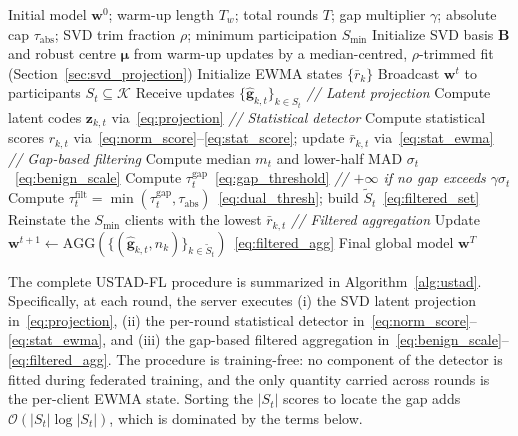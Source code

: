 \documentclass[journal]{IEEEtran}
\begin{document}
\begin{algorithm}[t]
\caption{USTAD-FL: Unsupervised Statistical Anomaly Detection at the server}
\label{alg:ustad}
\begin{algorithmic}[1]
\REQUIRE Initial model $\mathbf{w}^{0}$; warm-up length $T_w$; total rounds $T$; gap multiplier $\gamma$; absolute cap $\tau_{\mathrm{abs}}$; SVD trim fraction $\rho$; minimum participation $S_{\min}$
\STATE Initialize SVD basis $\mathbf{B}$ and robust centre $\boldsymbol{\mu}$ from warm-up updates by a median-centred, $\rho$-trimmed fit (Section~\ref{sec:svd_projection})
\STATE Initialize EWMA states $\{\bar r_{k}\}$
    \STATE Broadcast $\mathbf{w}^{t}$ to participants $S_t \subseteq \mathcal{K}$
    \STATE Receive updates $\{\hat{\mathbf{g}}_{k,t}\}_{k\in S_t}$
    \STATE \textit{// Latent projection}
    \STATE Compute latent codes $\mathbf{z}_{k,t}$ via~\eqref{eq:projection}
    \STATE \textit{// Statistical detector}
    \STATE Compute statistical scores $r_{k,t}$ via~\eqref{eq:norm_score}--\eqref{eq:stat_score}; update $\bar r_{k,t}$ via~\eqref{eq:stat_ewma}
    \STATE \textit{// Gap-based filtering}
    \STATE Compute median $m_t$ and lower-half MAD $\sigma_t$~\eqref{eq:benign_scale}
    \STATE Compute $\tau_t^{\mathrm{gap}}$~\eqref{eq:gap_threshold} \textit{// $+\infty$ if no gap exceeds $\gamma\sigma_t$}
    \STATE Compute $\tau_t^{\mathrm{filt}} = \min(\tau_t^{\mathrm{gap}}, \tau_{\mathrm{abs}})$~\eqref{eq:dual_thresh}; build $\widetilde{S}_t$~\eqref{eq:filtered_set}
        \STATE Reinstate the $S_{\min}$ clients with the lowest $\bar r_{k,t}$
    \ENDIF
    \STATE \textit{// Filtered aggregation}
    \STATE Update $\mathbf{w}^{t+1} \!\leftarrow\! \text{AGG}(\{(\hat{\mathbf{g}}_{k,t},n_k)\}_{k\in\widetilde{S}_t})$~\eqref{eq:filtered_agg}
\ENDFOR
\RETURN Final global model $\mathbf{w}^{T}$
\end{algorithmic}
\end{algorithm}

The complete USTAD-FL procedure is summarized in Algorithm~\ref{alg:ustad}. Specifically, at each round, the server executes (i) the SVD latent projection in~\eqref{eq:projection}, (ii) the per-round statistical detector in~\eqref{eq:norm_score}--\eqref{eq:stat_ewma}, and (iii) the gap-based filtered aggregation in~\eqref{eq:benign_scale}--\eqref{eq:filtered_agg}. The procedure is training-free: no component of the detector is fitted during federated training, and the only quantity carried across rounds is the per-client EWMA state. Sorting the $|S_t|$ scores to locate the gap adds $\mathcal{O}(|S_t|\log|S_t|)$, which is dominated by the terms below.
\end{document}
